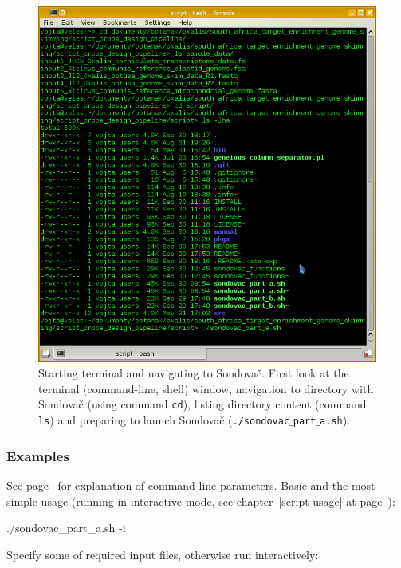 \documentclass[a4paper, 11pt, twoside]{article}
\begin{document}
\begin{figure}[htbp]
  \includegraphics[width=\textwidth]{terminal.png}
  \caption[Starting terminal and navigating to Sondovač]{Starting terminal and navigating to Sondovač. First look at the terminal (command-line, shell) window, navigation to directory with Sondovač (using command \texttt{cd}), listing directory content (command \texttt{ls}) and preparing to launch Sondovač (\texttt{./sondovac$\_$part$\_$a.sh}).}
  \label{terminal}
\end{figure}

\subsubsection{Examples}

See page~\pageref{script-usage} for explanation of command line parameters. Basic and the most simple usage (running in interactive mode, see chapter~\ref{script-usage} at page~\pageref{script-usage}):

\begin{bashcode}
  ./sondovac_part_a.sh -i
\end{bashcode}

Specify some of required input files, otherwise run interactively:
\end{document}
